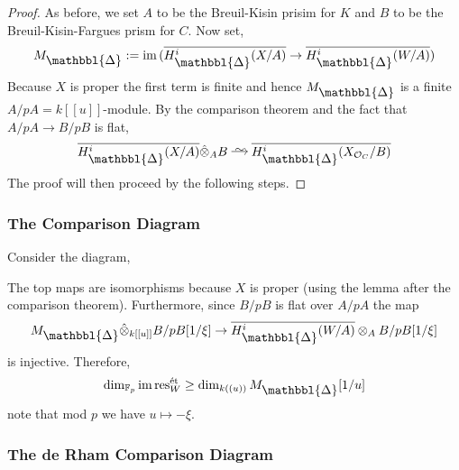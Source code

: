 \documentclass[12pt]{article}
\newcommand{\Prism}{{\mathlarger{\mathbbl{\Delta}}}}
\begin{document}
\begin{proof}
As before, we set $A$ to be the Breuil-Kisin prisim for $K$ and $B$ to be the Breuil-Kisin-Fargues prism for $C$. Now set,
\[ M_{\Prism} := \im{(\ol{H^i_{\Prism}(X/A)} \to \ol{H^i_{\Prism}(W/A)})} \]
Because $X$ is proper the first term is finite and hence $M_{\Prism}$ is a finite $A/pA = k[[u]]$-module. By the comparison theorem and the fact that $A / p A \to B / p B$ is flat,
\[ \ol{H^i_{\Prism}(X/A)} \hat{\ot}_A B \iso \ol{H^i_{\Prism}(X_{\cO_C}/B)} \]
The proof will then proceed by the following steps.
\end{proof}

\subsubsection{The \etale Comparison Diagram}

Consider the diagram,
\begin{center}
\end{center}
The top maps are isomorphisms because $X$ is proper (using the lemma after the \etale comparison theorem). Furthermore, since $B/pB$ is flat over $A/pA$ the map 
\[ M_{\Prism} \hat{\ot}_{k[[u]]} B / p B[1/\xi] \to \ol{H^i_{\Prism}(W/A)} \ot_A B / p B[1/\xi] \]
is injective. Therefore,
\[ \dim_{\FF_p} \im{\res^{\et}_W} \ge \dim_{k((u))} M_{\Prism}[1/u] \]
note that mod $p$ we have $u \mapsto - \xi$. 

\subsubsection{The de Rham Comparison Diagram}
\end{document}

